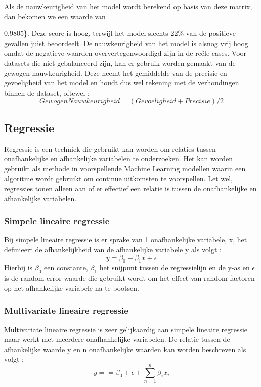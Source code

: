Als de nauwkeurigheid van het model wordt berekend op basis van deze matrix, dan bekomen we een waarde van {\~0.9805\}. Deze score is hoog, terwijl het model slechts 22\% van de positieve gevallen juist beoordeelt. De nauwkeurigheid van het model is alsnog vrij hoog omdat de negatieve  waarden oververtegenwoordigd zijn in de reële cases. Voor datasets die niet gebalanceerd zijn, kan er gebruik worden gemaakt van de gewogen nauwkeurigheid. Deze neemt het gemiddelde van de precisie en gevoeligheid van het model en houdt dus wel rekening met de verhoudingen binnen de dataset, oftewel : 
\[Gewogen Nauwkeurigheid = (Gevoeligheid + Precisie) / 2\]
\autocite{Olugbenga2022}

\subsection{Regressie}
Regressie is een techniek die gebruikt kan worden om relaties tussen onafhankelijke en afhankelijke variabelen te onderzoeken. Het kan worden gebruikt als methode in voorspellende Machine Learning modellen waarin een algoritme wordt gebruikt om continue uitkomsten te voorspellen. Let wel, regressies tonen alleen aan of er effectief een relatie is tussen de onafhankelijke en afhankelijke variabelen. 
\subsubsection{Simpele lineaire regressie}
Bij simpele lineaire regressie is er sprake van 1 onafhankelijke variabele, x, het definieert de afhankelijkheid van de afhankelijke variabele y als volgt : 
\[y = \beta_0 + \beta_1x + \epsilon\]
Hierbij is \(\beta_0\) een constante, \(\beta_1\) het snijpunt tussen de regressielijn en de y-as en \(\epsilon\) is de random error waarde die gebruikt wordt om het effect van random factoren op het afhankelijke variabele na te bootsen. 

\subsubsection{Multivariate lineaire regressie}
Multivariate lineaire regressie is zeer gelijkaardig aan simpele lineaire regressie maar werkt met meerdere onafhankelijke variabelen. De relatie tussen de afhankelijke waarde y en n onafhankelijke waarden kan worden beschreven als volgt : 
\[y = = \beta_0 + \epsilon + \sum_{n=1}^{n} \beta_i x_i \]

}
